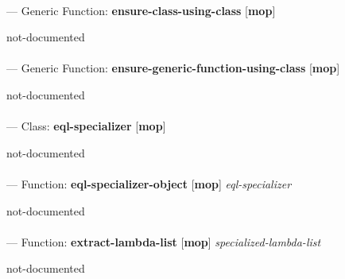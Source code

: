 \paragraph{}
\label{MOP:ENSURE-CLASS-USING-CLASS}
--- Generic Function: \textbf{ensure-class-using-class} [\textbf{mop}] \textit{}

\begin{adjustwidth}{5em}{5em}
not-documented
\end{adjustwidth}

\paragraph{}
\label{MOP:ENSURE-GENERIC-FUNCTION-USING-CLASS}
--- Generic Function: \textbf{ensure-generic-function-using-class} [\textbf{mop}] \textit{}

\begin{adjustwidth}{5em}{5em}
not-documented
\end{adjustwidth}

\paragraph{}
\label{MOP:EQL-SPECIALIZER}
--- Class: \textbf{eql-specializer} [\textbf{mop}] \textit{}

\begin{adjustwidth}{5em}{5em}
not-documented
\end{adjustwidth}

\paragraph{}
\label{MOP:EQL-SPECIALIZER-OBJECT}
--- Function: \textbf{eql-specializer-object} [\textbf{mop}] \textit{eql-specializer}

\begin{adjustwidth}{5em}{5em}
not-documented
\end{adjustwidth}

\paragraph{}
\label{MOP:EXTRACT-LAMBDA-LIST}
--- Function: \textbf{extract-lambda-list} [\textbf{mop}] \textit{specialized-lambda-list}

\begin{adjustwidth}{5em}{5em}
not-documented
\end{adjustwidth}

